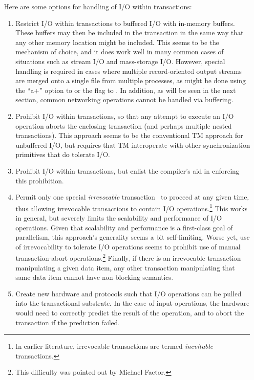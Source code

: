 Here are some options for handling of I/O within transactions:

\begin{enumerate}
\item	Restrict I/O within transactions to buffered I/O with in-memory
	buffers.
	These buffers may then be included in the transaction in the
	same way that any other memory location might be included.
	This seems to be the mechanism of choice, and it does work
	well in many common cases of situations such as stream I/O and
	mass-storage I/O.
	However, special handling is required in cases where multiple
	record-oriented output streams are merged onto a single file
	from multiple processes, as might be done using the ``a+''
	option to  or the   flag to .
	In addition, as will be seen in the next section, common
	networking operations cannot be handled via buffering.
\item	Prohibit I/O within transactions, so that any attempt to execute
	an I/O operation aborts the enclosing transaction (and perhaps
	multiple nested transactions).
	This approach seems to be the conventional TM approach for
	unbuffered I/O, but requires that TM interoperate with other
	synchronization primitives that do tolerate I/O.
\item	Prohibit I/O within transactions, but enlist the compiler's aid
	in enforcing this prohibition.
\item	Permit only one special
	\emph{irrevocable} transaction~\cite{SpearMichaelScott2008InevitableSTM}
	to proceed
	at any given time, thus allowing irrevocable transactions to
	contain I/O operations.\footnote{
		In earlier literature, irrevocable transactions are
		termed \emph{inevitable} transactions.}
	This works in general, but severely limits the scalability and
	performance of I/O operations.
	Given that scalability and performance is a first-class goal of
	parallelism, this approach's generality seems a bit self-limiting.
	Worse yet, use of irrevocability to tolerate I/O operations
	seems to prohibit use of manual transaction-abort operations.\footnote{
		This difficulty was pointed out by Michael Factor.}
	Finally, if there is an irrevocable transaction manipulating
	a given data item, any other transaction manipulating that
	same data item cannot have non-blocking semantics.
\item	Create new hardware and protocols such that I/O operations can
	be pulled into the transactional substrate.
	In the case of input operations, the hardware would need to
	correctly predict the result of the operation, and to abort the
	transaction if the prediction failed.
\end{enumerate}

